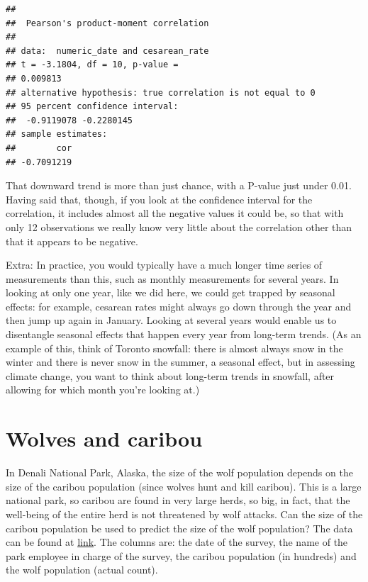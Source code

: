 \documentclass[]{tufte-book}
\theoremstyle{definition}
\theoremstyle{definition}
\theoremstyle{definition}
\theoremstyle{remark}
\begin{document}
\begin{verbatim}
## 
##  Pearson's product-moment correlation
## 
## data:  numeric_date and cesarean_rate
## t = -3.1804, df = 10, p-value =
## 0.009813
## alternative hypothesis: true correlation is not equal to 0
## 95 percent confidence interval:
##  -0.9119078 -0.2280145
## sample estimates:
##        cor 
## -0.7091219
\end{verbatim}

That downward trend is more than just chance, with a P-value just under
0.01. Having said that, though, if you look at the confidence interval
for the correlation, it includes almost all the negative values it could
be, so that with only 12 observations we really know very little about
the correlation other than that it appears to be negative.

Extra: In practice, you would typically have a much longer time series
of measurements than this, such as monthly measurements for several
years. In looking at only one year, like we did here, we could get
trapped by seasonal effects: for example, cesarean rates might always go
down through the year and then jump up again in January. Looking at
several years would enable us to disentangle seasonal effects that
happen every year from long-term trends. (As an example of this, think
of Toronto snowfall: there is almost always snow in the winter and there
is never snow in the summer, a seasonal effect, but in assessing climate
change, you want to think about long-term trends in snowfall, after
allowing for which month you're looking at.)

\hypertarget{wolves-and-caribou}{%
\section{Wolves and caribou}\label{wolves-and-caribou}}

In Denali National Park, Alaska, the size of the wolf population depends
on the size of the caribou population (since wolves hunt and kill
caribou). This is a large national park, so caribou are found in very
large herds, so big, in fact, that the well-being of the entire herd is
not threatened by wolf attacks.
Can the size of the caribou population be used to predict the size of
the wolf population? The data can be found at
\href{http://www.utsc.utoronto.ca/~butler/c32/caribou.txt}{link}. The
columns are: the date of the survey,
the name of the park employee in charge of the survey, the caribou
population (in hundreds) and the wolf population (actual count).
\end{document}
